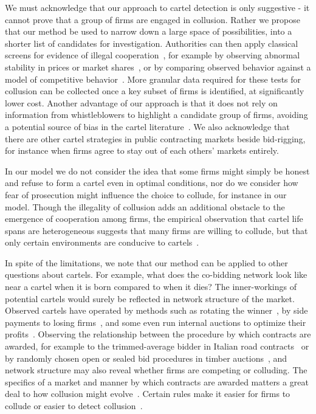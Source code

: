 We must acknowledge that our approach to cartel detection is only suggestive - it cannot prove that a group of firms are engaged in collusion. Rather we propose that our method be used to narrow down a large space of possibilities, into a shorter list of candidates for investigation. Authorities can then apply classical screens for evidence of illegal cooperation~\cite{harrington2006behavioral,fazekas2016}, for example by observing abnormal stability in prices or market shares~\cite{abrantes2006variance,imhof2017simple}, or by comparing observed behavior against a model of competitive behavior~\cite{bajari2003deciding,pesendorfer2000}. More granular data required for these tests for collusion can be collected once a key subset of firms is identified, at significantly lower cost. Another advantage of our approach is that it does not rely on information from whistleblowers to highlight a candidate group of firms, avoiding a potential source of bias in the cartel literature~\cite{allain2011determination}. We also acknowledge that there are other cartel strategies in public contracting markets beside bid-rigging, for instance when firms agree to stay out of each others' markets entirely.

In our model we do not consider the idea that some firms might simply be honest and refuse to form a cartel even in optimal conditions, nor do we consider how fear of prosecution might influence the choice to collude, for instance in our model. Though the illegality of collusion adds an additional obstacle to the emergence of cooperation among firms, the empirical observation that cartel life spans are heterogeneous suggests that many firms are willing to collude, but that only certain environments are conducive to cartels~\cite{levenstein2006determines}. 

In spite of the limitations, we note that our method can be applied to other questions about cartels. For example, what does the co-bidding network look like near a cartel when it is born compared to when it dies? The inner-workings of potential cartels would surely be reflected in network structure of the market. Observed cartels have operated by methods such as rotating the winner~\cite{ishii2009favor}, by side payments to losing firms~\cite{pesendorfer2000}, and some even run internal auctions to optimize their profits~\cite{asker2010study}. Observing the relationship between the procedure by which contracts are awarded, for example to the trimmed-average bidder in Italian road contracts~\cite{conley2016} or by randomly chosen open or sealed bid procedures in timber auctions~\cite{athey2011comparing}, and network structure may also reveal whether firms are competing or colluding. The specifics of a market and manner by which contracts are awarded matters a great deal to how collusion might evolve~\cite{hendricks1989}. Certain rules make it easier for firms to collude or easier to detect collusion~\cite{conley2016,athey2011comparing}. 

